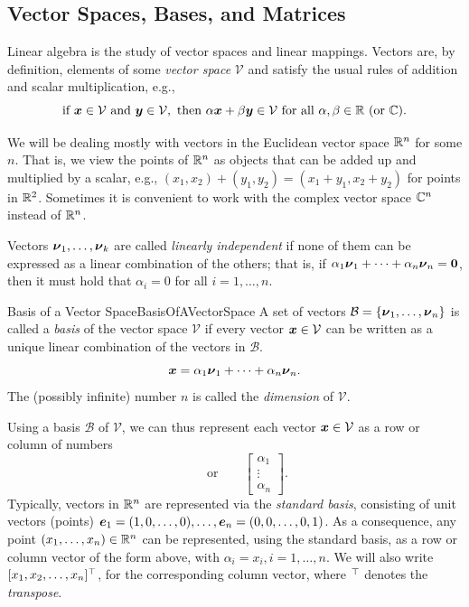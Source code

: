 \subsection{Vector Spaces, Bases, and Matrices}
Linear algebra is the study of vector spaces and linear mappings. Vectors are, by definition, elements of some \textit{vector space} \(\mathcal{V}\) and satisfy the usual rules of addition and scalar multiplication, e.g.,
\[
	\text{if } \boldsymbol{x} \in \mathcal{V} \text{ and } \boldsymbol{y} \in \mathcal{V}, \text{ then } \alpha \boldsymbol{x} + \beta \boldsymbol{y} \in \mathcal{V} \text{ for all } \alpha, \beta \in \mathbb{R} \text{ (or } \mathbb{C}\text{)}.
\]

We will be dealing mostly with vectors in the Euclidean vector space \(\mathbb{R}^n\) for some \(n\). That is, we view the points of \(\mathbb{R}^n\) as objects that can be added up and multiplied by a scalar, e.g., \((x_1, x_2) + (y_1, y_2) = (x_1 + y_1, x_2 + y_2)\) for points in \(\mathbb{R}^2\). Sometimes it is convenient to work with the complex vector space \(\mathbb{C}^n\) instead of \(\mathbb{R}^n\).

Vectors \(\boldsymbol{\nu}_1, \dots, \boldsymbol{\nu}_k\) are called \textit{linearly independent} if none of them can be expressed as a linear combination of the others; that is, if \(\alpha_1 \boldsymbol{\nu}_1 + \dots + \alpha_n \boldsymbol{\nu}_n = \boldsymbol{0}\), then it must hold that \(\alpha_i = 0\) for all \(i = 1, \dots, n\).

\begin{defn}{Basis of a Vector Space}{BasisOfAVectorSpace}
	A set of vectors \(\mathcal{B} = \{\boldsymbol{\nu}_1, \dots, \boldsymbol{\nu}_n\}\) is called a \textit{basis} of the vector space \(\mathcal{V}\) if every vector \(\boldsymbol{x} \in \mathcal{V}\) can be written as a unique linear combination of the vectors in \(\mathcal{B}\).
	\begin{equation*}
		\boldsymbol{x} = \alpha_1 \boldsymbol{\nu}_1 + \dots + \alpha_n \boldsymbol{\nu}_n.
	\end{equation*}
	The (possibly infinite) number \(n\) is called the \textit{dimension} of \(\mathcal{V}\).
\end{defn}
Using a basis \(\mathcal{B}\) of \(\mathcal{V}\), we can thus represent each vector \(\boldsymbol{x} \in \mathcal{V}\) as a row or column of numbers
\begin{equation}
	[\alpha_1, \dots, \alpha_n] \qquad \text{or} \qquad
	\begin{bmatrix}
		\alpha_1 \\ \vdots \\ \alpha_n
	\end{bmatrix}.
	\label{eq:VectorRep}
\end{equation}
Typically, vectors in \(\mathbb{R}^n\) are represented via the \textit{standard basis}, consisting of unit vectors (points) \(\boldsymbol{e}_1 = (1, 0, \dots, 0), \dots, \boldsymbol{e}_n = (0, 0, \dots, 0, 1)\). As a consequence, any point \((x_1, \dots, x_n) \in \mathbb{R}^n\) can be represented, using the standard basis, as a row or column vector of the form  above, with \(\alpha_i = x_i, i = 1, \dots, n\). We will also write \([x_1, x_2, \dots, x_n]^\top\), for the corresponding column vector, where \({}^\top\) denotes the \textit{transpose}.

